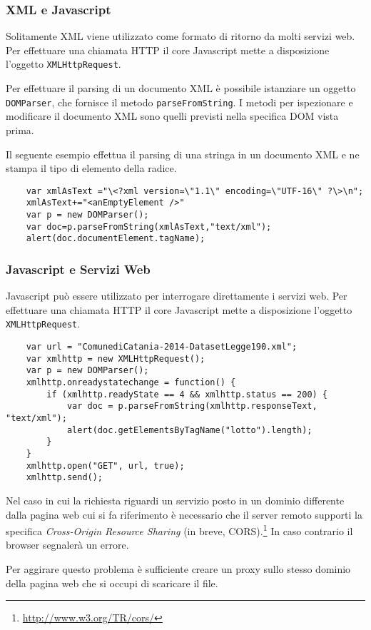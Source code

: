 \documentclass[8pt]{beamer}
\begin{document}
\begin{frame}[fragile]
 \frametitle{XML e Javascript}
 
 Solitamente XML viene utilizzato come formato di ritorno da molti servizi
 web. Per effettuare una chiamata HTTP il core Javascript mette a disposizione
 l'oggetto \texttt{XMLHttpRequest}. 
 \vspace{\baselineskip}
 
 Per effettuare il parsing di un documento XML \`e possibile
 istanziare un oggetto \texttt{DOMParser}, che fornisce il metodo 
 \texttt{parseFromString}. I metodi per ispezionare e modificare 
 il documento XML sono quelli previsti nella specifica DOM vista 
 prima.
 \vspace{\baselineskip}

 Il seguente esempio effettua il parsing di una stringa in 
 un documento XML e ne stampa il tipo di elemento della radice.
\begin{small}
\begin{verbatim}
    var xmlAsText ="\<?xml version=\"1.1\" encoding=\"UTF-16\" ?\>\n";
    xmlAsText+="<anEmptyElement />"
    var p = new DOMParser();
    var doc=p.parseFromString(xmlAsText,"text/xml");
    alert(doc.documentElement.tagName); 
\end{verbatim}
\end{small}
\end{frame}

\begin{frame}[fragile]
 \frametitle{Javascript e Servizi Web}
 
 Javascript pu\`o essere utilizzato per interrogare direttamente i servizi web. 
 Per effettuare una chiamata HTTP il core Javascript mette a disposizione
 l'oggetto \texttt{XMLHttpRequest}. 
 \vspace{\baselineskip}

\begin{small}
\begin{verbatim}
    var url = "ComunediCatania-2014-DatasetLegge190.xml";
    var xmlhttp = new XMLHttpRequest();
    var p = new DOMParser();
    xmlhttp.onreadystatechange = function() {
        if (xmlhttp.readyState == 4 && xmlhttp.status == 200) {
            var doc = p.parseFromString(xmlhttp.responseText, "text/xml");
            alert(doc.getElementsByTagName("lotto").length);
        }
    }
    xmlhttp.open("GET", url, true);
    xmlhttp.send();
\end{verbatim}
\end{small}

Nel caso in cui la richiesta riguardi un servizio posto in un dominio differente
dalla pagina web cui si fa riferimento \`e necessario che il server remoto supporti
la specifica \emph{Cross-Origin Resource Sharing} (in breve, CORS).\footnote{\url{http://www.w3.org/TR/cors/}} 
In caso contrario il browser segnaler\`a un errore.
\vspace{\baselineskip}

Per aggirare questo problema \`e sufficiente creare un proxy sullo stesso dominio
della pagina web che si occupi di scaricare il file.
\end{frame}
\end{document}
